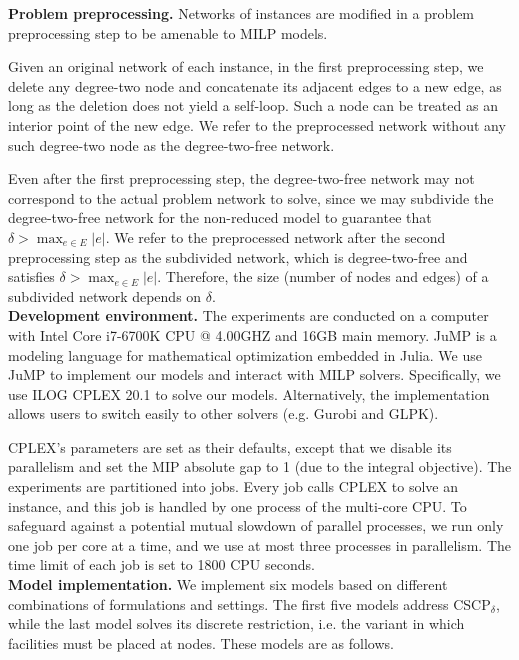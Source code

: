 \documentclass[review]{elsarticle}
\newcommand{\dlt}{{\delta}}
\newcommand{\problem}{CSCP$_\dlt$}
\theoremstyle{definition}
\begin{document}
\textbf{Problem preprocessing.}
Networks of instances are modified in a problem preprocessing step to be amenable to MILP models.

 Given an original network of each instance, in the first preprocessing step, we delete any degree-two node and concatenate its adjacent edges to a new edge, as long as the deletion does not yield a self-loop. Such a node can be treated as an interior point of the new edge. We refer to the preprocessed network without any such degree-two node as the degree-two-free network.


Even after the first preprocessing step,
 the degree-two-free network may not correspond to the actual problem network to solve, since we may subdivide the degree-two-free network for the non-reduced model to guarantee that $\dlt > \max_{e \in E} |e|$. We refer to the preprocessed network after the second preprocessing step as the subdivided network, which is degree-two-free and satisfies $\dlt > \max_{e \in E} |e|$.
 Therefore, the size (number of nodes and edges) of a subdivided network depends on $\dlt$.\\


\textbf{Development environment.}
The experiments are conducted on a computer with Intel Core i7-6700K  CPU @ 4.00GHZ and 16GB main memory. JuMP \cite{DunningHuchetteLubin2017} is a modeling language for mathematical optimization embedded in Julia. We use JuMP  to implement our models and interact with MILP solvers. Specifically, we use ILOG CPLEX 20.1 to solve our models. Alternatively, the implementation allows users to switch easily to other solvers (e.g. Gurobi and GLPK).

CPLEX's parameters are set as their defaults, except that we disable its parallelism and set  the MIP absolute gap to 1 (due to the integral objective). The experiments are partitioned into jobs. Every job calls CPLEX to solve an instance, and this job is handled by one process of the multi-core CPU. To safeguard
against a potential mutual slowdown of parallel processes, we run only one job per core at a
time, and we use at most three processes in parallelism.  The time limit of each job is set to 1800 CPU seconds.\\

\textbf{Model implementation.}
We implement six models based on different combinations of formulations and settings. The first five models address \problem, while the last model solves its discrete restriction, i.e. the variant in which facilities must be placed at nodes. These models are as follows.
\end{document}

